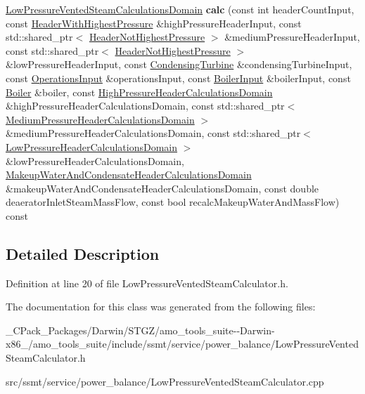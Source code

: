 \begin{DoxyCompactItemize}
\hyperlink{class_low_pressure_vented_steam_calculations_domain}{Low\+Pressure\+Vented\+Steam\+Calculations\+Domain} {\bfseries calc} (const int header\+Count\+Input, const \hyperlink{class_header_with_highest_pressure}{Header\+With\+Highest\+Pressure} \&high\+Pressure\+Header\+Input, const std\+::shared\+\_\+ptr$<$ \hyperlink{class_header_not_highest_pressure}{Header\+Not\+Highest\+Pressure} $>$ \&medium\+Pressure\+Header\+Input, const std\+::shared\+\_\+ptr$<$ \hyperlink{class_header_not_highest_pressure}{Header\+Not\+Highest\+Pressure} $>$ \&low\+Pressure\+Header\+Input, const \hyperlink{class_condensing_turbine}{Condensing\+Turbine} \&condensing\+Turbine\+Input, const \hyperlink{class_operations_input}{Operations\+Input} \&operations\+Input, const \hyperlink{class_boiler_input}{Boiler\+Input} \&boiler\+Input, const \hyperlink{class_boiler}{Boiler} \&boiler, const \hyperlink{class_high_pressure_header_calculations_domain}{High\+Pressure\+Header\+Calculations\+Domain} \&high\+Pressure\+Header\+Calculations\+Domain, const std\+::shared\+\_\+ptr$<$ \hyperlink{class_medium_pressure_header_calculations_domain}{Medium\+Pressure\+Header\+Calculations\+Domain} $>$ \&medium\+Pressure\+Header\+Calculations\+Domain, const std\+::shared\+\_\+ptr$<$ \hyperlink{class_low_pressure_header_calculations_domain}{Low\+Pressure\+Header\+Calculations\+Domain} $>$ \&low\+Pressure\+Header\+Calculations\+Domain, \hyperlink{class_makeup_water_and_condensate_header_calculations_domain}{Makeup\+Water\+And\+Condensate\+Header\+Calculations\+Domain} \&makeup\+Water\+And\+Condensate\+Header\+Calculations\+Domain, const double deaerator\+Inlet\+Steam\+Mass\+Flow, const bool recalc\+Makeup\+Water\+And\+Mass\+Flow) const
\end{DoxyCompactItemize}


\subsection{Detailed Description}


Definition at line 20 of file Low\+Pressure\+Vented\+Steam\+Calculator.\+h.



The documentation for this class was generated from the following files\+:\begin{DoxyCompactItemize}
\item 
\+\_\+\+C\+Pack\+\_\+\+Packages/\+Darwin/\+S\+T\+G\+Z/amo\+\_\+tools\+\_\+suite-\/-\/\+Darwin-\/x86\+\_/amo\+\_\+tools\+\_\+suite/include/ssmt/service/power\+\_\+balance/Low\+Pressure\+Vented\+Steam\+Calculator.\+h\item 
src/ssmt/service/power\+\_\+balance/Low\+Pressure\+Vented\+Steam\+Calculator.\+cpp\end{DoxyCompactItemize}
